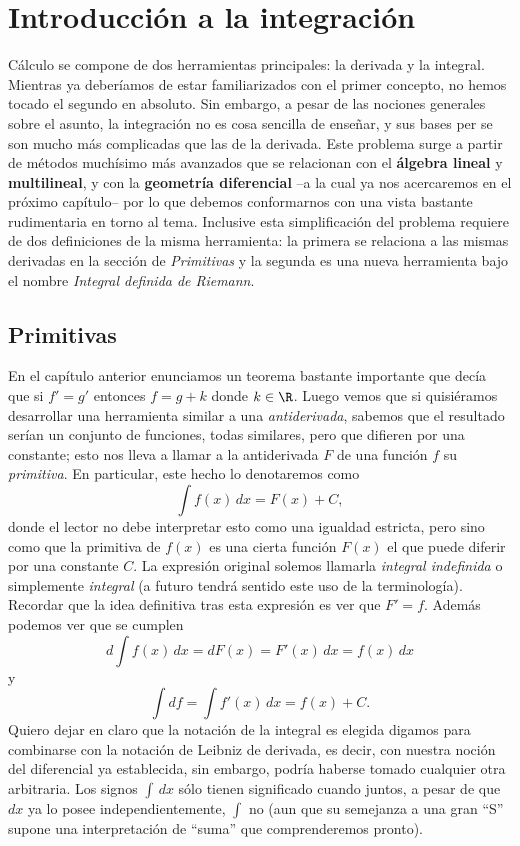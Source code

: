\documentclass[11pt,oneside,a4paper]{book}
\begin{document}
\chapter{Introducción a la integración}
Cálculo se compone de dos herramientas principales: la derivada y la integral. Mientras ya deberíamos de estar familiarizados con el primer concepto, no hemos tocado el segundo en absoluto. Sin embargo, a pesar de las nociones generales sobre el asunto, la integración no es cosa sencilla de enseñar, y sus bases per se son mucho más complicadas que las de la derivada. Este problema surge a partir de métodos muchísimo más avanzados que se relacionan con el \textbf{álgebra lineal} y \textbf{multilineal}, y con la \textbf{geometría diferencial} --a la cual ya nos acercaremos en el próximo capítulo-- por lo que debemos conformarnos con una vista bastante rudimentaria en torno al tema. Inclusive esta simplificación del problema requiere de dos definiciones de la misma herramienta: la primera se relaciona a las mismas derivadas en la sección de \textit{Primitivas} y la segunda es una nueva herramienta bajo el nombre \textit{Integral definida de Riemann}.

\section{Primitivas}
En el capítulo anterior enunciamos un teorema bastante importante que decía que si $f'=g'$ entonces $f=g+k$ donde $k\in\R$. Luego vemos que si quisiéramos desarrollar una herramienta similar a una \textit{antiderivada}, sabemos que el resultado serían un conjunto de funciones, todas similares, pero que difieren por una constante; esto nos lleva a llamar a la antiderivada $F$ de una función $f$ su \textit{primitiva}. En particular, este hecho lo denotaremos como
$$\int f(x)\,dx=F(x)+C,$$
donde el lector no debe interpretar esto como una igualdad estricta, pero sino como que la primitiva de $f(x)$ es una cierta función $F(x)$ el que puede diferir por una constante $C$. La expresión original solemos llamarla \textit{integral indefinida} o simplemente \textit{integral} (a futuro tendrá sentido este uso de la terminología). Recordar que la idea definitiva tras esta expresión es ver que $F'=f$. Además podemos ver que se cumplen
$$d\int f(x)\,dx=dF(x)=F'(x)\,dx=f(x)\,dx$$
y
$$\int df=\int f'(x)\,dx=f(x)+C.$$
Quiero dejar en claro que la notación de la integral es elegida digamos para combinarse con la notación de Leibniz de derivada, es decir, con nuestra noción del diferencial ya establecida, sin embargo, podría haberse tomado cualquier otra arbitraria. Los signos $\int\,dx$ sólo tienen significado cuando juntos, a pesar de que $dx$ ya lo posee independientemente, $\int$ no (aun que su semejanza a una gran ``S'' supone una interpretación de ``suma'' que comprenderemos pronto).
\end{document}
